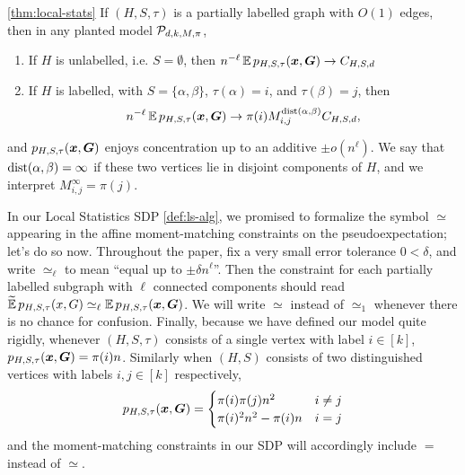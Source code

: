 \begin{lemma}
\begin{theorem} \ref{thm:local-stats}
    If $(H,S,\tau)$ is a partially labelled graph with $O(1)$ edges, then in any planted model $\mathcal{P}_{d,k,M,\pi}$,
    \begin{enumerate}
        \item If $H$ is unlabelled, i.e. $S = \emptyset$, then $n^{-\ell} \operatorname*{\mathbb{E}} p_{H,S,\tau}({\boldsymbol{x}},\boldsymbol{G}) \to C_{H,S,d}$
        \item If $H$ is labelled, with $S = \{\alpha,\beta\}$, $\tau(\alpha) = i$, and $\tau(\beta) = j$, then
        $$
            n^{-\ell} \operatorname*{\mathbb{E}} p_{H,S,\tau}({\boldsymbol{x}},\boldsymbol{G}) \to \pi(i) M_{i,j}^{\operatorname{dist}(\alpha,\beta)} C_{H,S,d},
        $$
    \end{enumerate}
    and $p_{H,S,\tau}({\boldsymbol{x}},\boldsymbol{G})$ enjoys concentration up to an additive $\pm o(n^\ell)$. We say that $\operatorname{dist}(\alpha,\beta) = \infty$ if these two vertices lie in disjoint components of $H$, and we interpret $M_{i,j}^\infty = \pi(j)$.
\end{theorem}

\begin{remark} \label{rem:ls-approx-def}
    In our Local Statistics SDP \ref{def:ls-alg}, we promised to formalize the symbol $\simeq$ appearing in the affine moment-matching constraints on the pseudoexpectation; let's do so now. Throughout the paper, fix a very small error tolerance $0 < \delta$, and write $\simeq_\ell$ to mean ``equal up to $\pm \delta n^\ell$''. Then the constraint for each partially labelled subgraph with $\ell$ connected components should read $\widetilde{\operatorname*{\mathbb{E}}}\, p_{H,S,\tau}(x,G) \simeq_\ell \operatorname*{\mathbb{E}} p_{H,S,\tau}({\boldsymbol{x}},\boldsymbol{G})$. We will write $\simeq$ instead of $\simeq_1$ whenever there is no chance for confusion. Finally, because we have defined our model quite rigidly, whenever $(H,S,\tau)$ consists of a single vertex with label $i\in [k]$, $p_{H,S,\tau}({\boldsymbol{x}},\boldsymbol{G}) = \pi(i)n$. Similarly when $(H,S)$ consists of two distinguished vertices with labels $i,j\in[k]$ respectively, $$
        p_{H,S,\tau}({\boldsymbol{x}},\boldsymbol{G}) = \begin{cases} \pi(i)\pi(j)n^2 &i\neq j \\
        \pi(i)^2n^2 - \pi(i)n &i=j \end{cases}
    $$
    and the moment-matching constraints in our SDP will accordingly include $=$ instead of $\simeq$.
\end{remark}


\end{lemma}
